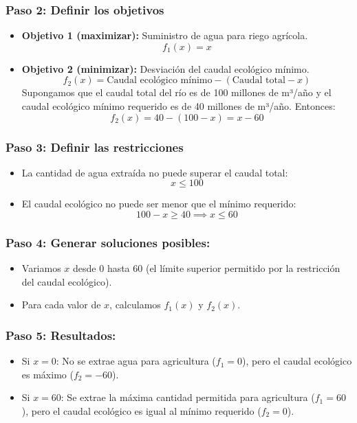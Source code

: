 \documentclass[12pt]{article}
\begin{document}
\subsubsection*{Paso 2: Definir los objetivos}  
\begin{itemize}
    \item \textbf{Objetivo 1 (maximizar):} Suministro de agua para riego agrícola.
    \[
        f_1(x) = x
    \]
    \item \textbf{Objetivo 2 (minimizar):} Desviación del caudal ecológico mínimo.
    \[
        f_2(x) = \text{Caudal ecológico mínimo} - (\text{Caudal total} - x)
    \]
    Supongamos que el caudal total del río es de 100 millones de m³/año y el caudal ecológico mínimo requerido es de 40 millones de m³/año. Entonces:
    \[
        f_2(x) = 40 - (100 - x) = x - 60
    \]
\end{itemize}

\subsubsection*{Paso 3: Definir las restricciones}  
\begin{itemize}
    \item La cantidad de agua extraída no puede superar el caudal total:
    \[
        x \leq 100
    \]
    \item El caudal ecológico no puede ser menor que el mínimo requerido:
    \[
        100 - x \geq 40 \implies x \leq 60
    \]
\end{itemize}


\subsubsection*{Paso 4: Generar soluciones posibles:}
    \begin{itemize}
        \item Variamos \( x \) desde 0 hasta 60 (el límite superior permitido por la restricción del caudal ecológico).
        \item Para cada valor de \( x \), calculamos \( f_1(x) \) y \( f_2(x) \).
    \end{itemize}

\subsubsection*{Paso 5: Resultados:}
    \begin{itemize}
        \item Si \( x = 0 \): No se extrae agua para agricultura (\( f_1 = 0 \)), pero el caudal ecológico es máximo (\( f_2 = -60 \)).
        \item Si \( x = 60 \): Se extrae la máxima cantidad permitida para agricultura (\( f_1 = 60 \)), pero el caudal ecológico es igual al mínimo requerido (\( f_2 = 0 \)).
    \end{itemize}
\end{document}
